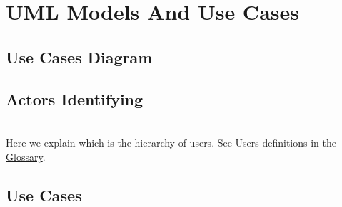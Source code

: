 \documentclass[english]{article}
\begin{document}
		
	
\section{UML Models And Use Cases}
	\subsection{Use Cases Diagram}
	\noindent


	\subsection{Actors Identifying}
		\noindent
		\\
	Here we explain which is the hierarchy of users. See Users definitions in the \hyperref[sec:Glossary]{Glossary}.  
	\subsection{Use Cases}
\end{document}
